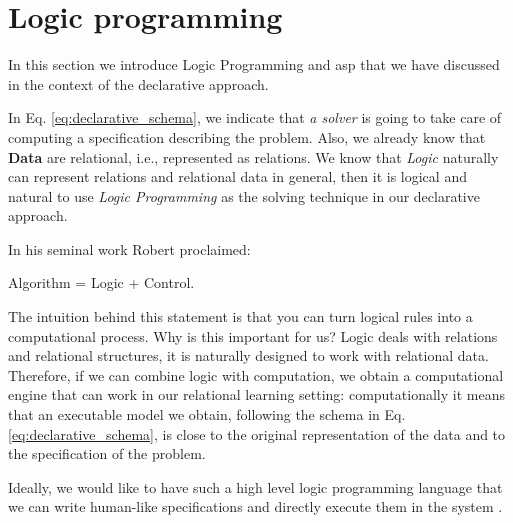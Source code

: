 \section{Logic programming}\label{sec:logic_programming}
In this section we introduce Logic Programming and \acrlong{asp} that
we have discussed in the context of the declarative approach.


\pubrev
In Eq. \ref{eq:declarative_schema}, we indicate that \textit{a solver}
is going to take care of computing a specification describing the
problem. Also, we already know that \textbf{Data} are relational, i.e., represented as relations. We know that \textit{Logic} naturally can represent relations and relational data in general, then it is logical and natural to use \textit{Logic Programming} as the solving technique in our declarative approach.
\pubrev

In his seminal work Robert \textcite{kowalski} proclaimed:
\begin{center}
  Algorithm = Logic + Control.
\end{center}

The intuition behind this statement is that
you can turn logical rules into a computational process. 
Why is this important for us? Logic deals with
relations and relational structures, it is naturally designed to
work with relational data. Therefore, if we can combine logic
with computation, we obtain a computational engine that can work in
\pubrev
our relational learning setting: computationally it means that an
executable model we obtain, following the schema in Eq. \ref{eq:declarative_schema}, is close to the original representation of the data and to the specification of the problem.

Ideally, we would like to have such a high level logic programming language that we can write human-like specifications and directly execute them in the system \parencite{denecker}.
\pubrevend

